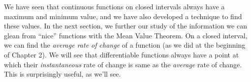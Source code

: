 

We have seen that continuous functions on closed intervals always have a maximum and minimum value, and we have also developed a technique to find these values. In the next section, we further our study of the information we can glean from ``nice'' functions with the Mean Value Theorem. On a closed interval, we can find the \textit{average rate of change} of a function (as we did at the beginning of Chapter 2). We will see that differentiable functions always have a point at which their \textit{instantaneous} rate of change is same as the \textit{average} rate of change. This is surprisingly useful, as we'll see.





